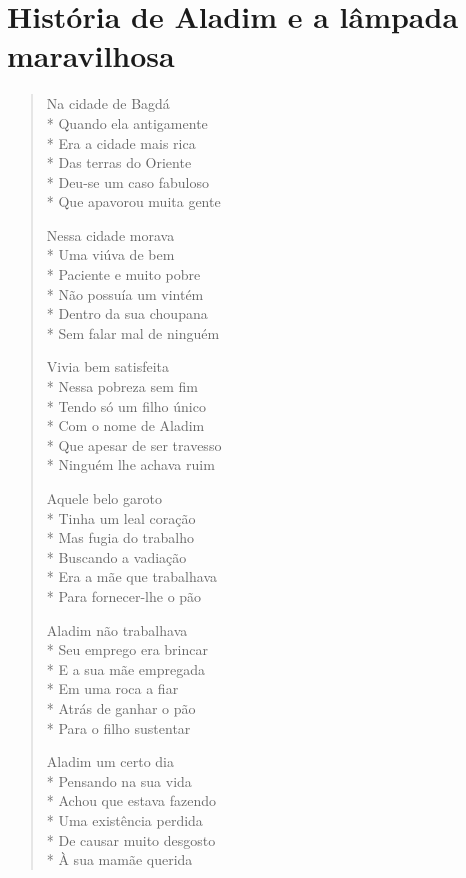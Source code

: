 \chapter{História de Aladim e a lâmpada maravilhosa}

\begin{verse}
Na cidade de Bagdá\\*
Quando ela antigamente\\*
Era a cidade mais rica\\*
Das terras do Oriente\\*
Deu-se um caso fabuloso\\*
Que apavorou muita gente

Nessa cidade morava\\*
Uma viúva de bem\\*
Paciente e muito pobre\\*
Não possuía um vintém\\*
Dentro da sua choupana\\*
Sem falar mal de ninguém

Vivia bem satisfeita\\*
Nessa pobreza sem fim\\*
Tendo só um filho único\\*
Com o nome de Aladim\\*
Que apesar de ser travesso\\*
Ninguém lhe achava ruim

Aquele belo garoto\\*
Tinha um leal coração\\*
Mas fugia do trabalho\\*
Buscando a vadiação\\*
Era a mãe que trabalhava\\*
Para fornecer-lhe o pão

Aladim não trabalhava\\*
Seu emprego era brincar\\*
E a sua mãe empregada\\*
Em uma roca a fiar\\*
Atrás de ganhar o pão\\*
Para o filho sustentar

Aladim um certo dia\\*
Pensando na sua vida\\*
Achou que estava fazendo\\*
Uma existência perdida\\*
De causar muito desgosto\\*
À sua mamãe querida


\end{verse}

